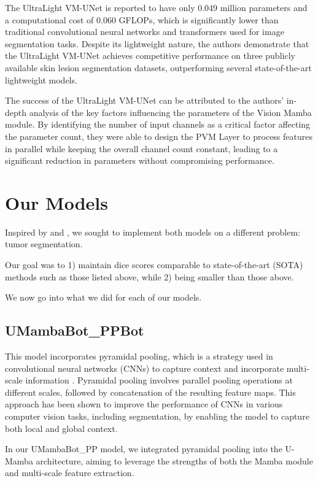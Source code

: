 \documentclass[conference]{IEEEtran}
\begin{document}
The UltraLight VM-UNet is reported to have only 0.049 million parameters and a computational cost of 0.060 GFLOPs, which is significantly lower than traditional convolutional neural networks and transformers used for image segmentation tasks. Despite its lightweight nature, the authors demonstrate that the UltraLight VM-UNet achieves competitive performance on three publicly available skin lesion segmentation datasets, outperforming several state-of-the-art lightweight models.

The success of the UltraLight VM-UNet can be attributed to the authors' in-depth analysis of the key factors influencing the parameters of the Vision Mamba module. By identifying the number of input channels as a critical factor affecting the parameter count, they were able to design the PVM Layer to process features in parallel while keeping the overall channel count constant, leading to a significant reduction in parameters without compromising performance.

\section{Our Models}

Inspired by \cite{U-Mamba} and \cite{ultralightvmunet}, we sought to implement both models on a different problem: tumor segmentation.

Our goal was to 1) maintain dice scores comparable to state-of-the-art (SOTA) methods such as those listed above, while 2) being smaller than those above.

We now go into what we did for each of our models.


\subsection{UMambaBot\_PPBot}

This model incorporates pyramidal pooling, which is a strategy used in convolutional neural networks (CNNs) to capture context and incorporate multi-scale information \cite{zhao2017pyramid}. Pyramidal pooling involves parallel pooling operations at different scales, followed by concatenation of the resulting feature maps. This approach has been shown to improve the performance of CNNs in various computer vision tasks, including segmentation, by enabling the model to capture both local and global context.

In our UMambaBot\_PP model, we integrated pyramidal pooling into the U-Mamba architecture, aiming to leverage the strengths of both the Mamba module and multi-scale feature extraction.
\end{document}
